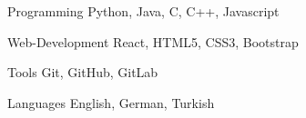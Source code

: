 
\begin{cvskills}

  \cvskill
    {Programming}
    {Python, Java, C, C++, Javascript}

  \cvskill
    {Web-Development}
    {React, HTML5, CSS3, Bootstrap}

  \cvskill
    {Tools}
    {Git, GitHub, GitLab}

  \cvskill
    {Languages}
    {English, German, Turkish}

\end{cvskills}
